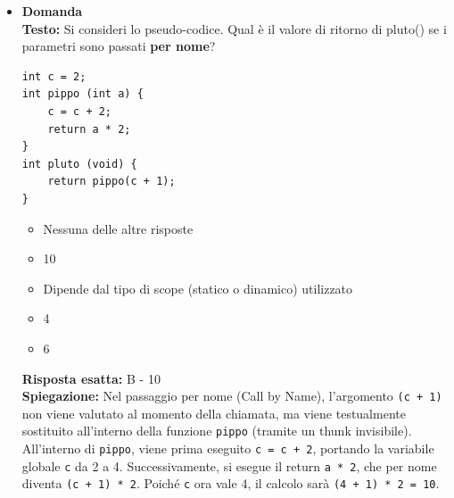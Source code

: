 \documentclass[12pt, a4paper]{article}
\newcounter{domandateoria}
\begin{document}
\begin{itemize}
    \item {}\textbf{Domanda \thedomandateoria} \\
    \textbf{Testo:} Si consideri lo pseudo-codice. Qual è il valore di ritorno di pluto() se i parametri sono passati \textbf{per nome}?
\begin{verbatim}
int c = 2;
int pippo (int a) {
    c = c + 2;
    return a * 2;
}
int pluto (void) {
    return pippo(c + 1);
}
\end{verbatim}
    \begin{itemize}
        \item[A)] Nessuna delle altre risposte
        \item[B)] 10
        \item[C)] Dipende dal tipo di scope (statico o dinamico) utilizzato
        \item[D)] 4
        \item[E)] 6
    \end{itemize}
    \textbf{Risposta esatta:} B - 10 \\
    \textbf{Spiegazione:} Nel passaggio per nome (Call by Name), l'argomento \texttt{(c + 1)} non viene valutato al momento della chiamata, ma viene testualmente sostituito all'interno della funzione \texttt{pippo} (tramite un thunk invisibile). All'interno di \texttt{pippo}, viene prima eseguito \texttt{c = c + 2}, portando la variabile globale \texttt{c} da 2 a 4. Successivamente, si esegue il return \texttt{a * 2}, che per nome diventa \texttt{(c + 1) * 2}. Poiché \texttt{c} ora vale 4, il calcolo sarà \texttt{(4 + 1) * 2 = 10}.
    \vspace{0.3cm}


\end{itemize}
\end{document}
